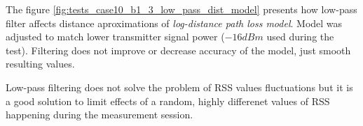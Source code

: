 \documentclass[../main.tex]{subfiles}
\begin{document}
The figure \ref{fig:tests_case10_b1_3_low_pass_dist_model} presents how low-pass filter affects distance aproximations of \textit{log-distance path loss model}. Model was adjusted to match lower transmitter signal power ($-16dBm$ used during the test). Filtering does not improve or decrease accuracy of the model, just smooth resulting values.

Low-pass filtering does not solve the problem of RSS values fluctuations but it is a good solution to limit effects of a random, highly differenet values of RSS happening during the measurement session.

\end{document}
